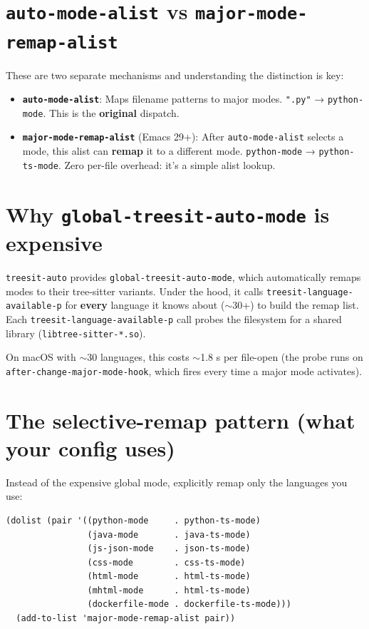 \section{\texttt{auto-mode-alist} vs \texttt{major-mode-remap-alist}}\label{auto-mode-alist-vs-major-mode-remap-alist}

These are two separate mechanisms and understanding the distinction is key:

\begin{itemize}
\item \textbf{\texttt{auto-mode-alist}}: Maps filename patterns to major modes. \texttt{".py"} → \texttt{python-mode}. This is the \textbf{original} dispatch.
\item \textbf{\texttt{major-mode-remap-alist}} (Emacs 29+): After \texttt{auto-mode-alist} selects a mode, this alist can \textbf{remap} it to a different mode. \texttt{python-mode} → \texttt{python-ts-mode}. Zero per-file overhead: it's a simple alist lookup.
\end{itemize}

\section{Why \texttt{global-treesit-auto-mode} is expensive}\label{why-global-treesit-auto-mode-is-expensive}

\texttt{treesit-auto} provides \texttt{global-treesit-auto-mode}, which automatically remaps modes to their tree-sitter variants. Under the hood, it calls \texttt{treesit-language-available-p} for \textbf{every} language it knows about (\(\sim\)30+) to build the remap list. Each \texttt{treesit-language-available-p} call probes the filesystem for a shared library (\texttt{libtree-sitter-*.so}).

On macOS with \(\sim\)30 languages, this costs \(\sim\)1.8 s per file-open (the probe runs on \texttt{after-change-major-mode-hook}, which fires every time a major mode activates).

\section{The selective-remap pattern (what your config uses)}\label{the-selective-remap-pattern-what-your-config-uses}

Instead of the expensive global mode, explicitly remap only the languages you use:

\begin{verbatim}
(dolist (pair '((python-mode     . python-ts-mode)
                (java-mode       . java-ts-mode)
                (js-json-mode    . json-ts-mode)
                (css-mode        . css-ts-mode)
                (html-mode       . html-ts-mode)
                (mhtml-mode      . html-ts-mode)
                (dockerfile-mode . dockerfile-ts-mode)))
  (add-to-list 'major-mode-remap-alist pair))
\end{verbatim}

